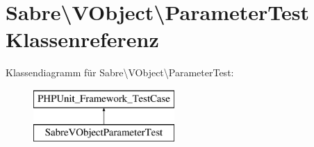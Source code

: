 \hypertarget{class_sabre_1_1_v_object_1_1_parameter_test}{}\section{Sabre\textbackslash{}V\+Object\textbackslash{}Parameter\+Test Klassenreferenz}
\label{class_sabre_1_1_v_object_1_1_parameter_test}
Klassendiagramm für Sabre\textbackslash{}V\+Object\textbackslash{}Parameter\+Test\+:\begin{figure}[H]
\begin{center}
\leavevmode
\includegraphics[height=2.000000cm]{class_sabre_1_1_v_object_1_1_parameter_test}
\end{center}
\end{figure}
